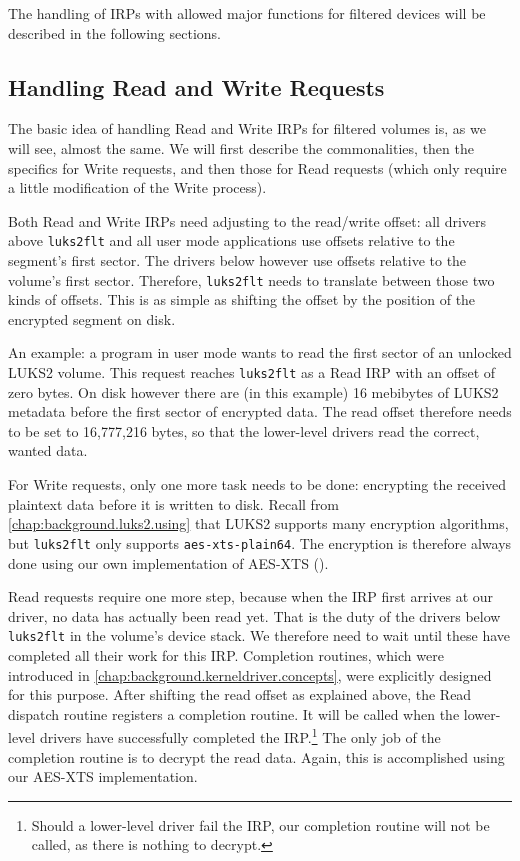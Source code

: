 The handling of IRPs with allowed major functions for filtered devices will be described in the following  sections.

\subsection{Handling Read and Write Requests}
\label{chap:ourapproach.final.de_encrypting}
The basic idea of handling Read and Write IRPs for filtered volumes is, as we will see, almost the same. We will first describe the commonalities, then the specifics for Write requests, and then those for Read requests (which only require a little modification of the Write process).

Both Read and Write IRPs need adjusting to the read/write offset: all drivers above \texttt{luks2flt} and all user mode applications use offsets relative to the segment's first sector. The drivers below however use offsets relative to the volume's first sector. Therefore, \texttt{luks2flt} needs to translate between those two kinds of offsets. This is as simple as shifting the offset by the position of the encrypted segment on disk.

An example: a program in user mode wants to read the first sector of an unlocked LUKS2 volume. This request reaches \texttt{luks2flt} as a Read IRP with an offset of zero bytes. On disk however there are (in this example) 16 mebibytes of LUKS2 metadata before the first sector of encrypted data. The read offset therefore needs to be set to 16,777,216 bytes, so that the lower-level drivers read the correct, wanted data.

For Write requests, only one more task needs to be done: encrypting the received plaintext data before it is written to disk. Recall from \autoref{chap:background.luks2.using} that LUKS2 supports many encryption algorithms, but \texttt{luks2flt} only supports \texttt{aes-xts-plain64}. The encryption is therefore always done using our own implementation of AES-XTS ().

Read requests require one more step, because when the IRP first arrives at our driver, no data has actually been read yet. That is the duty of the drivers below \texttt{luks2flt} in the volume's device stack. We therefore need to wait until these have completed all their work for this IRP. Completion routines, which were introduced in \autoref{chap:background.kerneldriver.concepts}, were explicitly designed for this purpose. After shifting the read offset as explained above, the Read dispatch routine registers a completion routine. It will be called when the lower-level drivers have successfully completed the IRP.\footnote{\label{fn:ourapproach.final.failedlowerlevel} Should a lower-level driver fail the IRP, our completion routine will not be called, as there is nothing to decrypt.} The only job of the completion routine is to decrypt the read data. Again, this is accomplished using our AES-XTS implementation.

